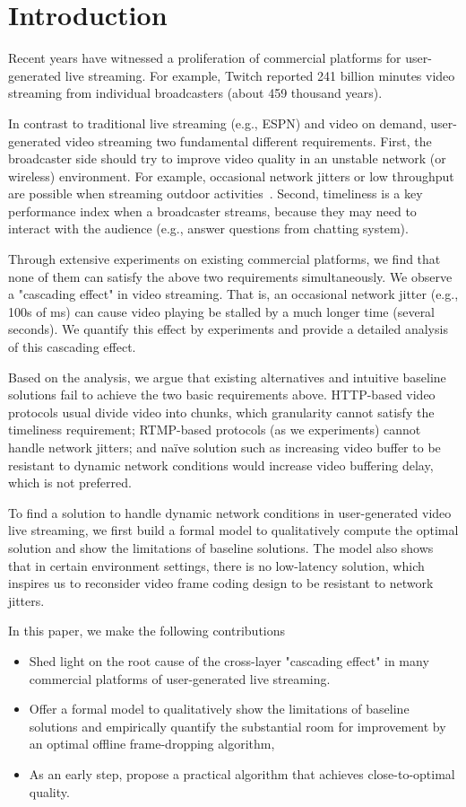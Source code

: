 \iffalse

\section{Introduction}
Recent years have witnessed a proliferation of commercial platforms for user-generated live streaming. For example, Twitch reported 241 billion minutes video streaming from individual broadcasters (about 459 thousand years).

In contrast to traditional live streaming (e.g., ESPN) and video on demand, user-generated video streaming two fundamental different requirements. First, the broadcaster side should try to improve video quality in an unstable network (or wireless) environment. For example, occasional network jitters or low throughput are possible when streaming outdoor activities~\cite{xx}. Second, timeliness is a key performance index when a broadcaster streams, because they may need to interact with the audience (e.g., answer questions from chatting system).

Through extensive experiments on existing commercial platforms, we find that none of them can satisfy the above two requirements simultaneously. We observe a "cascading effect" in video streaming. That is, an occasional network jitter (e.g., 100s of ms) can cause video playing be stalled by a much longer time (several seconds). We quantify this effect by experiments and provide a detailed analysis of this cascading effect.

Based on the analysis, we argue that existing alternatives and intuitive baseline solutions fail to achieve the two basic requirements above. HTTP-based video protocols usual divide video into chunks, which granularity cannot satisfy the timeliness requirement; RTMP-based protocols (as we experiments) cannot handle network jitters; and naïve solution such as increasing video buffer to be resistant to dynamic network conditions would increase video buffering delay, which is not preferred.

To find a solution to handle dynamic network conditions in user-generated video live streaming, we first build a formal model to qualitatively compute the optimal solution and show the limitations of baseline solutions. The model also shows that in certain environment settings, there is no low-latency solution, which inspires us to reconsider video frame coding design to be resistant to network jitters.

In this paper, we make the following contributions
\begin{itemize}
\item Shed light on the root cause of the cross-layer "cascading effect" in many commercial platforms of user-generated live streaming.
\item Offer a formal model to qualitatively show the limitations of baseline solutions and empirically quantify the substantial room for improvement by an optimal offline frame-dropping algorithm,
\item As an early step, propose a practical algorithm that achieves close-to-optimal quality.
\end{itemize}


